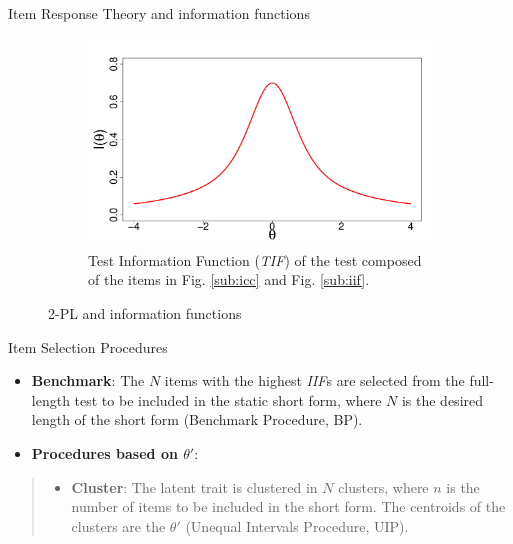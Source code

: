 \documentclass[final,t]{beamer}
\begin{document}
\begin{frame}
\begin{columns}[t]
\begin{column}{.45\linewidth}
\begin{block}{\centering Item Response Theory and information functions}
\begin{figure}
		\begin{subfigure}{.45\linewidth}
			\includegraphics[width=\linewidth]{img/tif.pdf}
			\caption{Test Information Function (\emph{TIF}) of the test composed of the items in Fig. \ref{sub:icc} and Fig. \ref{sub:iif}.}
			\label{sub:tif}
		\end{subfigure}
		\caption{2-PL and information functions}
	\end{figure}
\end{block}
			
		
				

				
				\begin{block}{\centering Item Selection Procedures}
					 \begin{itemize}
					 	\item \textbf{Benchmark}: The $N$ items with the highest \emph{IIF}s are selected from the full-length test to be included in the static short form, where $N$ is the desired length of the short form (Benchmark Procedure, BP).
					 
					 	
					 	\item \textbf{Procedures based on $\theta'$}:
					 \end{itemize}
					 	\begin{quote}
					 		\begin{itemize}
					 			
					 			\item \textbf{Cluster}: The latent trait is clustered in $N$ clusters, where $n$ is the number of items to be included in the short form. The centroids of the clusters are the $\theta'$ (Unequal Intervals Procedure, UIP).
					 			

\end{itemize}
\end{quote}
\end{block}
\end{column}
\end{columns}
\end{frame}
\end{document}
